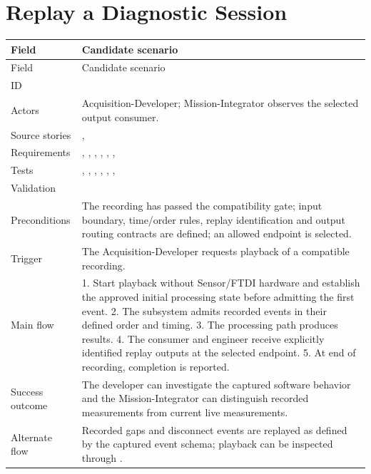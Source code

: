 \section{Replay a Diagnostic Session}
\par\medskip
\small
\begin{tabularx}{\linewidth}{L{2.8cm}Y}
\caption{Replay a Diagnostic Session\label{Table:UC-05}}\\
\toprule
Field & Candidate scenario\\\midrule
\endfirsthead
\toprule
Field & Candidate scenario\\\midrule
\endhead
\bottomrule
\endlastfoot
ID & \\
Actors & Acquisition-Developer; Mission-Integrator observes the selected output consumer.\\
Source stories & , \\
Requirements & , , , , , , \\
Tests & , , , , , , \\
Validation & \\
Preconditions & The recording has passed the compatibility gate; input boundary, time/order rules, replay identification and output routing contracts are defined; an allowed endpoint is selected.\\
Trigger & The Acquisition-Developer requests playback of a compatible recording.\\
Main flow & 1. Start playback without Sensor/FTDI hardware and establish the approved initial processing state before admitting the first event. 2. The subsystem admits recorded events in their defined order and timing. 3. The processing path produces results. 4. The consumer and engineer receive explicitly identified replay outputs at the selected endpoint. 5. At end of recording, completion is reported.\\
Success outcome & The developer can investigate the captured software behavior and the Mission-Integrator can distinguish recorded measurements from current live measurements.\\
Alternate flow & Recorded gaps and disconnect events are replayed as defined by the captured event schema; playback can be inspected through .\\

\end{tabularx}
